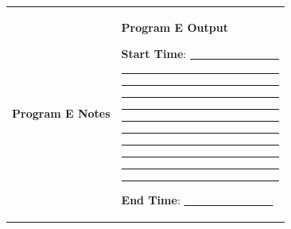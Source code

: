 \documentclass[12pt, a4paper, oneside]{article}
\begin{document}
\begin{longtable}[]{@{}ll@{}}


\begin{minipage}[t]{0.5\columnwidth}\raggedright\strut
\textbf{Program E Notes}
\strut\end{minipage} &
\begin{minipage}[t]{0.5\columnwidth}\raggedright\strut
\textbf{Program E Output}

\vspace{20pt}

\textbf{Start Time}: \underline{~~~~~~~~~~~~~~~~}

\vspace{10pt}

\begin{center}\vspace{6pt}\rule{\linewidth}{\linethickness}\end{center}
\begin{center}\vspace{6pt}\rule{\linewidth}{\linethickness}\end{center}
\begin{center}\vspace{6pt}\rule{\linewidth}{\linethickness}\end{center}
\begin{center}\vspace{6pt}\rule{\linewidth}{\linethickness}\end{center}
\begin{center}\vspace{6pt}\rule{\linewidth}{\linethickness}\end{center}
\begin{center}\vspace{6pt}\rule{\linewidth}{\linethickness}\end{center}
\begin{center}\vspace{6pt}\rule{\linewidth}{\linethickness}\end{center}
\begin{center}\vspace{6pt}\rule{\linewidth}{\linethickness}\end{center}
\begin{center}\vspace{6pt}\rule{\linewidth}{\linethickness}\end{center}
\begin{center}\vspace{6pt}\rule{\linewidth}{\linethickness}\end{center}

\vspace{20pt}

\textbf{End Time}: \underline{~~~~~~~~~~~~~~~~}

\strut\end{minipage}\tabularnewline

\end{longtable}
\end{document}
